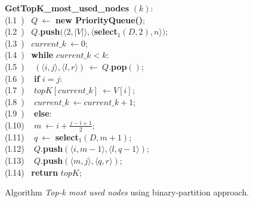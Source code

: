 \begin{itemize}[leftmargin=3mm]
\begin{itemize}
	\end{itemize}


	\begin{figure}[t]
		\begin{center}
			\begin{minipage}{0.70\textwidth}
				\begin{code}
					\textbf{GetTopK\_most\_used\_nodes} $(k)$: \\
					\>(l.1~) \> ~$ Q ~\leftarrow$ \textbf{new PriorityQueue()}; \\
					\>(l.2~) \> ~$ Q .$\textbf{push$(\langle2, |V|\rangle, \langle$select$_1(D,2), n\rangle)$}; \\
					\>(l.3~) \> ~$ current\_k ~\leftarrow 0$; \\%
					
					\>(l.4~) \> ~\textbf{while }$current\_k < k$: \\
					\>(l.5~) \> ~\> $ (\langle i,j\rangle, \langle l,r\rangle) ~\leftarrow ~Q.$\textbf{pop$()$}; \\%
					
					\>(l.6~) \> ~\> \textbf{if} $i = j$: \\
					\>(l.7~) \> ~\> \> $ topK[current\_k] ~\leftarrow V[i]$; \\
					\>(l.8~) \> ~\> \> $ current\_k ~\leftarrow current\_k + 1$; \\
					\>(l.9~) \> ~\> \textbf{else}: \\
					\>(l.10) \> ~\> \> $ m ~\leftarrow i + \frac{j - i + 1}{2}$; \\
					\>(l.11) \> ~\> \> $ q ~\leftarrow$ \textbf{select$_1(D,m + 1)$}; \\
					\>(l.12) \> ~\> \> $ Q .$\textbf{push$(\langle i, m-1 \rangle, \langle l, q-1 \rangle)$}; \\
					\>(l.13) \> ~\> \> $ Q .$\textbf{push$(\langle m, j \rangle, \langle q, r \rangle)$}; \\%
					\>(l.14) \> ~\textbf{return} $topK$; \\
				\end{code}
			\end{minipage}
		\end{center}
		\vspace{-0.3cm}
		\caption{Algorithm {\em Top-k most used nodes} using binary-partition approach.}
		\label{fig:topk_nieves}
	\end{figure}


\end{itemize}
